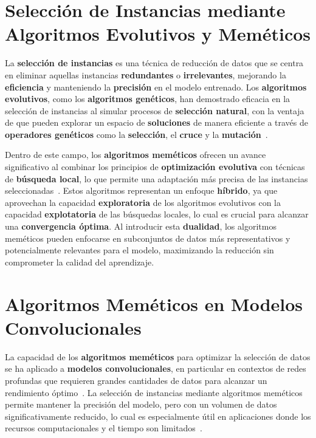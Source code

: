 \section{Selección de Instancias mediante Algoritmos Evolutivos y Meméticos}
\label{sec:seleccion-de-instancias-mediante-algoritmos-evolutivos-y-memeticos}
La \textbf{selección de instancias} es una técnica de reducción de datos que se centra en eliminar aquellas instancias
\textbf{redundantes} o \textbf{irrelevantes}, mejorando la \textbf{eficiencia} y manteniendo la \textbf{precisión} en
el modelo entrenado.
Los \textbf{algoritmos evolutivos}, como los \textbf{algoritmos genéticos}, han demostrado eficacia en la selección de
instancias al simular procesos de \textbf{selección natural}, con la ventaja de que pueden explorar un espacio de
\textbf{soluciones} de manera eficiente a través de \textbf{operadores genéticos} como la \textbf{selección}, el
\textbf{cruce} y la \textbf{mutación}~\cite{holland_adaptation_1975}.


Dentro de este campo, los \textbf{algoritmos meméticos} ofrecen un avance significativo al combinar los principios de
\textbf{optimización evolutiva} con técnicas de \textbf{búsqueda local}, lo que permite una adaptación más precisa de
las instancias seleccionadas~\cite{moscato_evolution_2000}.
Estos algoritmos representan un enfoque \textbf{híbrido}, ya que aprovechan la capacidad \textbf{exploratoria} de los
algoritmos evolutivos con la capacidad \textbf{explotatoria} de las búsquedas locales, lo cual es crucial para alcanzar
una \textbf{convergencia óptima}.
Al introducir esta \textbf{dualidad}, los algoritmos meméticos pueden enfocarse en subconjuntos de datos más
representativos y potencialmente relevantes para el modelo, maximizando la reducción sin comprometer la calidad del
aprendizaje.


\section{Algoritmos Meméticos en Modelos Convolucionales}\label{sec:algoritmos-memeticos-en-modelos-convolucionales}
La capacidad de los \textbf{algoritmos meméticos} para optimizar la selección de datos se ha aplicado a
\textbf{modelos convolucionales}, en particular en contextos de redes profundas que requieren grandes cantidades de
datos para alcanzar un rendimiento óptimo~\cite{neri_handbook_2012}.
La selección de instancias mediante algoritmos meméticos permite mantener la precisión del modelo, pero con un volumen
de datos significativamente reducido, lo cual es especialmente útil en aplicaciones donde los recursos computacionales
y el tiempo son
limitados~\cite{dong_memetic_2020}.


